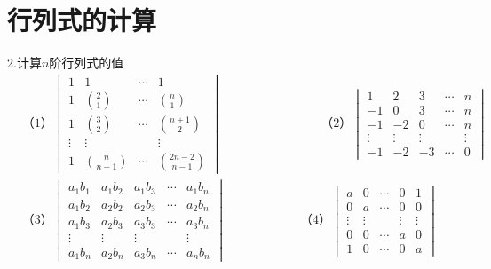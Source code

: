\section{行列式的计算}
2.计算$n$阶行列式的值
\begin{align*}
	& \text{（1）}
	\begin{vmatrix}
    1 & 1 & \cdots & 1\\
    1 & \binom{2}{1} & \cdots & \binom{n}{1} \\
    1 & \binom{3}{2} & \cdots & \binom{n + 1}{2} \\
    \vdots & \vdots & & \vdots \\
    1 & \binom{n }{n - 1} & \cdots & \binom{2n - 2}{ n - 1}   
\end{vmatrix}
\qquad\qquad\qquad\qquad
\text{（2）}
\begin{vmatrix}
	1 & 2 & 3 & \cdots & n\\
	-1 & 0 & 3 & \cdots & n\\
	-1 & -2 & 0 & \cdots & n\\
	\vdots & \vdots & \vdots & &\vdots\\
	-1 & -2 & -3 & \cdots & 0
\end{vmatrix}
\\
&\text{（3）}
\begin{vmatrix}
	a_1b_1 & a_1b_2 & a_1b_3 & \cdots & a_1b_n\\
	a_1b_2 & a_2b_2 & a_2b_3 & \cdots & a_2b_n\\
	a_1b_3 & a_2b_3 & a_3b_3 & \cdots & a_3b_n\\
	\vdots & \vdots & \vdots &		  & \vdots\\
	a_1b_n & a_2b_n & a_3b_n & \cdots & a_nb_n 
\end{vmatrix}
\qquad\qquad\qquad
\text{（4）}
\begin{vmatrix}
	a & 0 & \cdots & 0 & 1\\
	0 & a & \cdots & 0 & 0\\
	\vdots & \vdots & & \vdots & \vdots\\
	0 & 0 &\cdots &a & 0\\
	1 & 0&\cdots &0&a
\end{vmatrix}
\end{align*}
